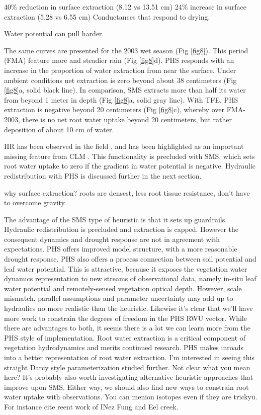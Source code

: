\documentclass[draft,linenumbers]{agujournal}
\begin{document}
40\% reduction in surface extraction (8.12 vs 13.51 cm)
24\% increase in surface extraction (5.28 vs 6.55 cm)
Conductances that respond to drying.

Water potential can pull harder.


The same curves are presented for the 2003 wet season (Fig \ref{fig8}).
This period (FMA) feature more and steadier rain (Fig \ref{fig8}d).
PHS responds with an increase in the proportion of water extraction from near the surface.
Under ambient conditions net extraction is zero beyond about 38 centimeters (Fig \ref{fig8}a, solid black line).
In comparison, SMS extracts more than half its water from beyond 1 meter in depth (Fig \ref{fig8}a, solid gray line).
With TFE, PHS extraction is negative beyond 20 centimeters (Fig \ref{fig8}c), whereby over FMA-2003,
there is no net root water uptake beyond 20 centimeters, but rather deposition of about 10 cm of water.

HR has been observed in the field \citep{oliveira2005}, and has been highlighted as an important missing feature from CLM \citep{lee2005}.
This functionality is precluded with SMS, which sets root water uptake to zero if the gradient in water potential is negative. 
Hydraulic redistribution with PHS is discussed further in the next section.

why surface extraction?
roots are densest, less root tissue resistance, don't have to overcome gravity

The advantage of the SMS type of heuristic is that it sets up guardrails.
Hydraulic redistribution is precluded and extraction is capped.
However the consequent dynamics and drought response are not in agreement with expectations.
PHS offers improved model structure, with a more reasonable drought response.
PHS also offers a process connection between soil potential and leaf water potential.
This is attractive, because it exposes the vegetation water dynamics representation to new streams of observational data, 
namely in-situ leaf water potential and remotely-sensed vegetation optical depth.
However, scale mismatch, parallel assumptions and parameter uncertainty may add up to hydraulics no more realistic than the heuristic.
Likewise it's clear that we'll have more work to constrain the degrees of freedom in the PHS RWU vector.
While there are advantages to both, it seems there is a lot we can learn more from the PHS style of implementation.
Root water extraction is a critical component of vegetation hydrodynamics and merits continued research.
PHS makes inroads into a better representation of root water extraction.
I'm interested in seeing this straight Darcy style parameterization studied further. Not clear what you mean here? 
It's probably also worth investigating alternative heuristic approaches that improve upon SMS.
Either way, we should also find new ways to constrain root water uptake with observations. You can menion isotopes even if they are trickyu. For instance cite reent work of INez Fung and Eel creek.
\end{document}
